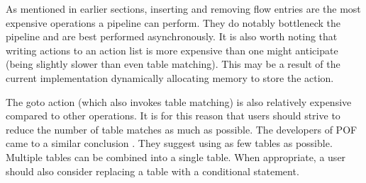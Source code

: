 As mentioned in earlier sections, inserting and removing flow entries are the most expensive operations a pipeline can perform. They do notably bottleneck the pipeline and are best performed asynchronously.
It is also worth noting that writing actions to an action list is more expensive than one might anticipate (being slightly slower than even table matching). This may be a result of the current implementation dynamically allocating memory to store the action.

The goto action (which also invokes table matching) is also relatively expensive compared to other operations. It is for this reason that users should strive to reduce the number of table matches as much as possible. The developers of POF came to a similar conclusion \cite{pof_impl} . They suggest using as few tables as possible. Multiple tables can be combined into a single table. When appropriate, a user should also consider replacing a table with a conditional statement.
